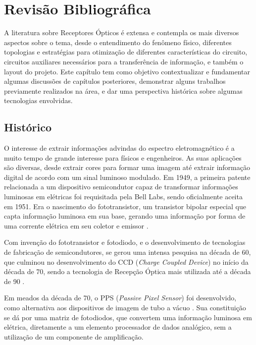 \chapter[Revisão Bibliográfica]{Revisão Bibliográfica}

A literatura sobre Receptores Ópticos \'e extensa e contempla os mais diversos aspectos sobre o tema, desde o entendimento do fenômeno físico, diferentes topologias e estrat\'egias para otimização de diferentes características do circuito, circuitos auxiliares necessários para a transferência de informação, e tamb\'em o layout do projeto. Este capítulo tem como objetivo contextualizar e fundamentar algumas discussões de capítulos posteriores, demonstrar alguns trabalhos previamente realizados na área, e dar uma perspectiva histórica sobre algumas tecnologias envolvidas.
\section{Histórico}
O interesse de extrair informações advindas do espectro eletromagn\'etico \'e a muito tempo de grande interesse para físicos e engenheiros. As suas aplicações são diversas, desde extrair cores para formar uma imagem at\'e extrair informação digital de acordo com um sinal luminoso modulado.
Em 1949, a primeira patente relacionada a um dispositivo semicondutor capaz de transformar informações luminosas em el\'etricas foi requisitada pela Bell Labs, sendo oficialmente aceita em 1951. Era o nascimento do fototransistor, um transistor bipolar especial que capta informação luminosa em sua base, gerando uma informação por forma de uma corrente el\'etrica em seu coletor e emissor \cite{Shive}.

Com invenção do fototransistor e fotodiodo, e o desenvolvimento de tecnologias de fabricação de semicondutores, se gerou uma intensa pesquisa na d\'ecada de 60, que culminou no desenvolvimento do CCD (\emph{Charge Coupled Device}) no início da d\'ecada de 70, sendo a tecnologia de Recepção Óptica mais utilizada at\'e a d\'ecada de 90 \cite{EstevaoCoelho, Andre}.

Em meados da d\'ecada de 70, o PPS (\emph{Passive Pixel Sensor}) foi desenvolvido, como alternativa aos dispositivos de imagem de tubo a vácuo \cite{Savvas}. Sua constituição se dá por uma matriz de fotodiodos, que convertem uma informação luminosa em el\'etrica, diretamente a um elemento processador de dados analógico, sem a utilização de um componente de amplificação.

